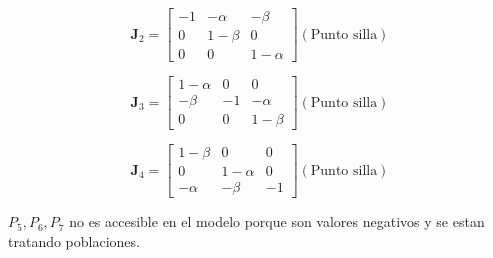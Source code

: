 \documentclass[twocolumn,aps,prl]{revtex4-1}
\newcommand{\talf}{\frac{\alpha - 1}{\alpha \beta - 1} }
\newcommand{\tbet}{\frac{\beta  - 1}{\alpha \beta - 1} }
\begin{document}
$$
\mathbf{J}_2 = 
\begin{bmatrix}
    -1 & - \alpha & - \beta \\
    0 & 1-\beta & 0 \\
    0 & 0 & 1- \alpha
\end{bmatrix} (\text{Punto silla})
$$

$$
\mathbf{J}_3 = 
\begin{bmatrix}
    1 - \alpha  & 0 & 0 \\
    - \beta & -1 & - \alpha \\
    0 & 0 & 1  - \beta
\end{bmatrix} (\text{Punto silla})
$$

$$
\mathbf{J}_4 = 
\begin{bmatrix}
    1 - \beta  & 0 & 0 \\
    0 & 1 -\alpha  & 0 \\
    - \alpha  & -\beta & -1
\end{bmatrix} (\text{Punto silla})
$$




$P_5, P_6, P_7$ no es accesible en el modelo porque son valores negativos y se estan tratando poblaciones.
\end{document}
